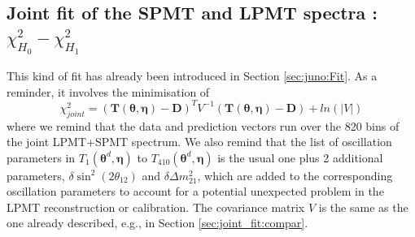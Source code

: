 \documentclass[../main.tex]{subfiles}
\begin{document}
%
%
%
%
%
%
%
%
%


\subsection{Joint fit of the SPMT and LPMT spectra : $\chi^2_{H_0}-\chi^2_{H_1}$}
\label{sec:joint_fit:hypothesis}

This kind of fit has already been introduced in Section \ref{sec:juno:Fit}.
As a reminder, it involves the minimisation of
\begin{equation}
  \chi^2_{joint}=\left(\bm{T}(\bm{\theta},\bm{\eta}) - \bm{D} \right)^T V^{-1} \left(\bm{T}(\bm{\theta},\bm{\eta}) - \bm{D}  \right) + ln(|V|)
\end{equation}
where we remind that the data and prediction vectors run over the 820 bins of the joint LPMT+SPMT spectrum.
We also remind that the list of oscillation parameters in $T_1(\bm{\theta}^d,\bm{\eta})$ to $T_{410}(\bm{\theta}^d,\bm{\eta})$ is the usual one plus 2 additional parameters, $\delta \sin^2(2\theta_{12})$ and $\delta \Delta m^2_{21}$, which are added to the corresponding oscillation parameters to account for a potential unexpected problem in the LPMT reconstruction or calibration.
The covariance matrix $V$ is the same as the one already described, e.g., in Section \ref{sec:joint_fit:compar}.
\end{document}
